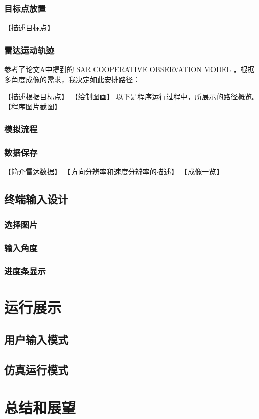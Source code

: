 \documentclass{xduugthesis}
\begin{document}
\subsection{目标点放置}
【描述目标点】
\subsection{雷达运动轨迹}
参考了论文A中提到的 SAR COOPERATIVE OBSERVATION MODEL ，根据多角度成像的需求，我决定如此安排路径：

【描述根据目标点】
【绘制图画】
以下是程序运行过程中，所展示的路径概览。
【程序图片截图】
\subsection{模拟流程}
\subsection{数据保存}
【简介雷达数据】
【方向分辨率和速度分辨率的描述】
【成像一览】
\section{终端输入设计}
\subsection{选择图片}
\subsection{输入角度}
\subsection{进度条显示}
\chapter{运行展示}
\section{用户输入模式}
\section{仿真运行模式}

\chapter{总结和展望}
\end{document}
